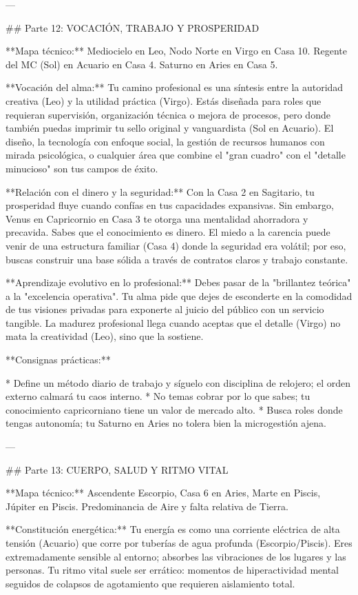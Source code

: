 ---

## Parte 12: VOCACIÓN, TRABAJO Y PROSPERIDAD

**Mapa técnico:** Mediocielo en Leo, Nodo Norte en Virgo en Casa 10. Regente del MC (Sol) en Acuario en Casa 4. Saturno en Aries en Casa 5.

**Vocación del alma:**
Tu camino profesional es una síntesis entre la autoridad creativa (Leo) y la utilidad práctica (Virgo). Estás diseñada para roles que requieran supervisión, organización técnica o mejora de procesos, pero donde también puedas imprimir tu sello original y vanguardista (Sol en Acuario). El diseño, la tecnología con enfoque social, la gestión de recursos humanos con mirada psicológica, o cualquier área que combine el "gran cuadro" con el "detalle minucioso" son tus campos de éxito.

**Relación con el dinero y la seguridad:**
Con la Casa 2 en Sagitario, tu prosperidad fluye cuando confías en tus capacidades expansivas. Sin embargo, Venus en Capricornio en Casa 3 te otorga una mentalidad ahorradora y precavida. Sabes que el conocimiento es dinero. El miedo a la carencia puede venir de una estructura familiar (Casa 4) donde la seguridad era volátil; por eso, buscas construir una base sólida a través de contratos claros y trabajo constante.

**Aprendizaje evolutivo en lo profesional:**
Debes pasar de la "brillantez teórica" a la "excelencia operativa". Tu alma pide que dejes de esconderte en la comodidad de tus visiones privadas para exponerte al juicio del público con un servicio tangible. La madurez profesional llega cuando aceptas que el detalle (Virgo) no mata la creatividad (Leo), sino que la sostiene.

**Consignas prácticas:**

* Define un método diario de trabajo y síguelo con disciplina de relojero; el orden externo calmará tu caos interno.
* No temas cobrar por lo que sabes; tu conocimiento capricorniano tiene un valor de mercado alto.
* Busca roles donde tengas autonomía; tu Saturno en Aries no tolera bien la microgestión ajena.

---

## Parte 13: CUERPO, SALUD Y RITMO VITAL

**Mapa técnico:** Ascendente Escorpio, Casa 6 en Aries, Marte en Piscis, Júpiter en Piscis. Predominancia de Aire y falta relativa de Tierra.

**Constitución energética:**
Tu energía es como una corriente eléctrica de alta tensión (Acuario) que corre por tuberías de agua profunda (Escorpio/Piscis). Eres extremadamente sensible al entorno; absorbes las vibraciones de los lugares y las personas. Tu ritmo vital suele ser errático: momentos de hiperactividad mental seguidos de colapsos de agotamiento que requieren aislamiento total.

